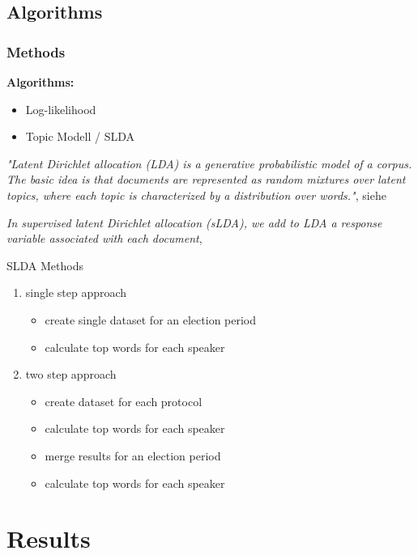 \documentclass[11pt, a4paper]{beamer}
\begin{document}
\subsection{Algorithms}
\begin{frame}
\frametitle{Methods}
\textbf{Algorithms:}
\begin{itemize}
\item Log-likelihood
\item Topic Modell / SLDA
\end{itemize}
\textit {"Latent Dirichlet allocation (LDA) is a generative probabilistic
	model of a corpus. The basic idea is that documents are represented as
 	random mixtures over latent topics, where each topic is characterized by a
 	distribution over words."}, siehe \cite{blatent}
%  	

\textit{In supervised latent Dirichlet allocation (sLDA), we add to LDA a response variable associated with each document}, \cite{BleiSupervisedTopicModels}
\end{frame}

\begin{frame}{SLDA Methods}
\begin{enumerate}
\item single step approach
\begin{itemize}
\item create single dataset for an election period
\item calculate top words for each speaker
\end{itemize}
\item two step approach
\begin{itemize}
\item create dataset for each protocol
\item calculate top words for each speaker
\item merge results for an election period
\item calculate top words for each speaker
\end{itemize}
\end{enumerate}
\end{frame}

\section{Results}
\end{document}
